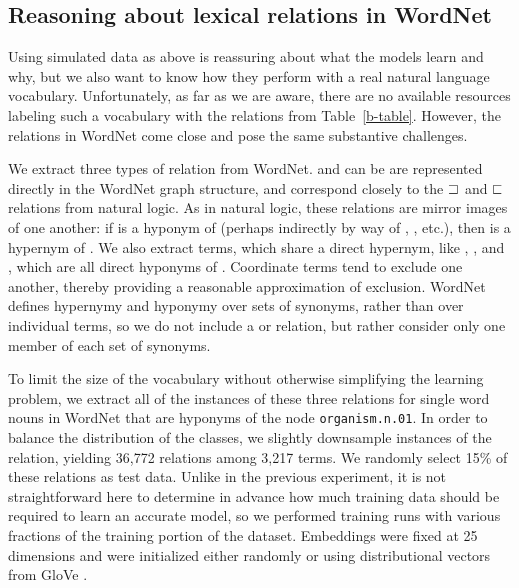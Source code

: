 \subsection*{Reasoning about lexical relations in WordNet}\label{sec:wordnet}

Using simulated data as above is reassuring about what the models
learn and why, but we also want to know how they perform with a real
natural language vocabulary. Unfortunately, as far as we are aware,
there are no available resources labeling such a vocabulary with the
relations from Table~\ref{b-table}. However, the relations in WordNet
\cite{fellbaum2010wordnet} come close and pose the same substantive
challenges.


We extract three types of relation from WordNet.  and
 can be are represented directly in the WordNet graph
structure, and correspond closely to the $\sqsupset$ and $\sqsubset$
relations from natural logic. As in natural logic, these relations are
mirror images of one another: if  is a hyponym of 
(perhaps indirectly by way of , , etc.), then
 is a hypernym of . We also extract 
terms, which share a direct hypernym, like , ,
and , which are all direct hyponyms of .  Coordinate
terms tend to exclude one another, thereby providing a reasonable
approximation of exclusion. WordNet defines hypernymy and hyponymy over
sets of synonyms, rather than over individual terms, so we do not
include a  or  relation, but rather
consider only one member of each set of synonyms.

To limit the size of the vocabulary without otherwise simplifying the learning problem, we extract all of the
instances of these three relations for single word nouns in WordNet that are hyponyms of the node 
\texttt{organism.n.01}. In order to balance the distribution of the classes, we slightly downsample instances 
of the  relation, yielding 36,772 relations among 3,217 terms. We randomly select 15\% of these 
relations as test data. Unlike in the previous experiment, it is not straightforward here to determine in advance
 how much training data should be required to learn an accurate model, so we performed training runs with 
 various fractions of the training portion of the 
dataset. Embeddings were fixed at 25 dimensions and were initialized either randomly or using distributional 
vectors from GloVe \cite{pennington2014glove}.

